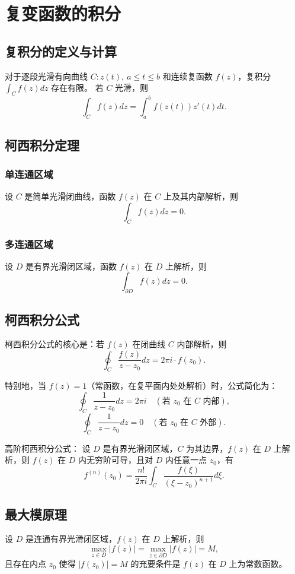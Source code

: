 \chapter{复变函数的积分}

\section{复积分的定义与计算}
对于逐段光滑有向曲线 \( C: z(t),\ a \leqslant t \leqslant b \) 和连续复函数 \( f(z) \)，复积分 \( \int_C f(z)dz \) 存在有限。
若 \( C \) 光滑，则
\[
\int_C f(z) dz = \int_a^b f(z(t)) z'(t) dt.
\]

\section{柯西积分定理}
\subsection{单连通区域}
设 \( C \) 是简单光滑闭曲线，函数 \( f(z) \) 在 \( C \) 上及其内部解析，则
\[
\int_C f(z) dz = 0.
\]

\subsection{多连通区域}
设 \( D \) 是有界光滑闭区域，函数 \( f(z) \) 在 \( D \) 上解析，则
\[
\int_{\partial D} f(z) dz = 0.
\]

\section{柯西积分公式}
柯西积分公式的核心是：若 \(f(z)\) 在闭曲线 \(C\) 内部解析，则
\[
\oint_C \frac{f(z)}{z - z_0} dz = 2\pi i \cdot f(z_0).
\]

特别地，当 \(f(z) = 1\)（常函数，在复平面内处处解析）时，公式简化为：
\[
\oint_C \frac{1}{z - z_0} dz = 2\pi i \quad (\text{若 } z_0 \text{ 在 } C \text{ 内部}),
\]
\[
\oint_C \frac{1}{z - z_0} dz = 0 \quad (\text{若 } z_0 \text{ 在 } C \text{ 外部}).
\]

高阶柯西积分公式：
设 \( D \) 是有界光滑闭区域，\( C \) 为其边界，\( f(z) \) 在 \( D \) 上解析，则 \( f(z) \) 在 \( D \) 内无穷阶可导，且对 \( D \) 内任意一点 \( z_0 \)，有
\[
f^{(n)}(z_0) = \frac{n!}{2\pi i} \int_C \frac{f(\xi)}{(\xi - z_0)^{n+1}} d\xi.
\]

\section{最大模原理}
设 \( D \) 是连通有界光滑闭区域，\( f(z) \) 在 \( D \) 上解析，则
\[
\max_{z \in D} |f(z)| = \max_{z \in \partial D} |f(z)| = M,
\]
且存在内点 \( z_0 \) 使得 \( |f(z_0)| = M \) 的充要条件是 \( f(z) \) 在 \( D \) 上为常数函数。